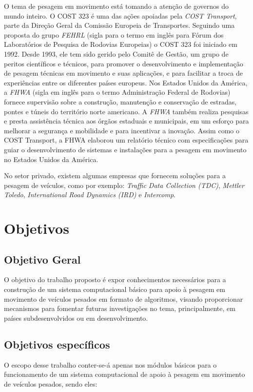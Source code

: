 \documentclass{ufscThesis}
\begin{document}
O tema de pesagem em movimento está tomando a atenção de governos do mundo inteiro. O COST 323 é uma das ações apoiadas pela \textit{COST Transport}, parte da Direção Geral da Comissão Europeia de Transportes. Seguindo uma proposta do grupo \textit{FEHRL} (sigla para o termo em inglês para Fórum dos Laboratórios de Pesquisa de Rodovias Europeias) o COST 323 foi iniciado em 1992. Desde 1993, ele tem sido gerido pelo Comitê de Gestão, um grupo de peritos científicos e técnicos, para promover o desenvolvimento e implementação de pesagem técnicas em movimento e suas aplicações, e para facilitar a troca de experiências entre os diferentes países europeus. Nos Estados Unidos da América, a \textit{FHWA} (sigla em inglês para o termo Administração Federal de Rodovias) fornece supervisão sobre a construção, manutenção e conservação de estradas, pontes e túneis do território norte americano. A \textit{FHWA} também realiza pesquisas e presta assistência técnica aos órgãos estaduais e municipais, em um esforço para melhorar a segurança e mobilidade e para incentivar a inovação. Assim como o COST Transport, a FHWA elaborou um relatório técnico \cite{tech:fhwa-wim-data-analysts-manual} com especificações para guiar o desenvolvimento de sistemas e instalações para a pesagem em movimento no Estados Unidos da América.

No setor privado, existem algumas empresas  que fornecem soluções para a pesagem de veículos, como por exemplo: \textit{Traffic Data Collection (TDC)}, \textit{Mettler Toledo}, \textit{International Road Dynamics (IRD)} e \textit{Intercomp}.


\section{Objetivos}\label{introducao-objetivos}
\subsection{Objetivo Geral}\label{introducao-objetivo-geral}
O objetivo do trabalho proposto é expor conhecimentos necessários para a construção de um sistema computacional básico para apoio à pesagem em movimento de veículos pesados em formato de algoritmos, visando proporcionar mecanismos para fomentar futuras investigações no tema, principalmente, em países subdesenvolvidos ou em desenvolvimento.

\subsection{Objetivos específicos}\label{introducao-objetivos-especificos}
O escopo desse trabalho conter-se-á apenas nos módulos básicos para o funcionamento de um sistema computacional de apoio à pesagem em movimento de veículos pesados, sendo eles:
\end{document}
